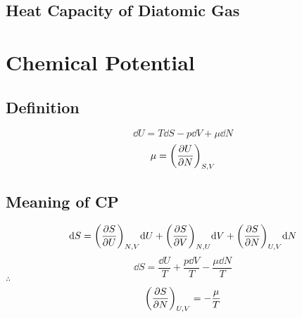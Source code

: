 \documentclass[UTF8]{ctexart} %
\numberwithin{equation}{subsection}
\begin{document}
\subsection{Heat Capacity of Diatomic Gas}




\section{Chemical Potential}
\subsection{Definition}
\begin{equation}\label{key}
\dd U = T\dd S - p\dd V + \mu\dd N
\end{equation}
\begin{equation}\label{key}
\mu = \qty(\pdv{U}{N})_{S,V}
\end{equation}

\subsection{Meaning of CP}
\begin{equation}\label{key}
\dd S = \qty(\pdv{S}{U})_{N,V}\dd U + \qty(\pdv{S}{V})_{N,U}\dd V + \qty(\pdv{S}{N})_{U,V}\dd N
\end{equation}
\begin{equation}\label{key}
\dd S = \dfrac{\dd U}{T} + \dfrac{p\dd V}{T} - \dfrac{\mu\dd N}{T}
\end{equation}
$\therefore$
\begin{equation}\label{key}
\qty(\pdv{S}{N})_{U,V} = -\dfrac{\mu}{T}
\end{equation}
\end{document}
